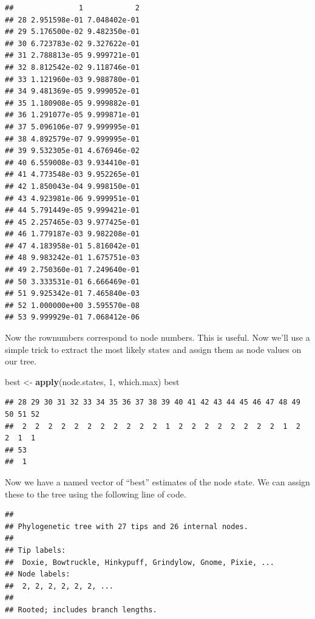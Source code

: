 \documentclass[]{book}
\newenvironment{Shaded}{\begin{snugshade}}{\end{snugshade}}
\newcommand{\KeywordTok}[1]{\textcolor[rgb]{0.13,0.29,0.53}{\textbf{{#1}}}}
\newcommand{\DecValTok}[1]{\textcolor[rgb]{0.00,0.00,0.81}{{#1}}}
\newcommand{\StringTok}[1]{\textcolor[rgb]{0.31,0.60,0.02}{{#1}}}
\newcommand{\NormalTok}[1]{{#1}}
\theoremstyle{definition}
\theoremstyle{definition}
\theoremstyle{definition}
\theoremstyle{remark}
\begin{document}
\begin{verbatim}
##               1            2
## 28 2.951598e-01 7.048402e-01
## 29 5.176500e-02 9.482350e-01
## 30 6.723783e-02 9.327622e-01
## 31 2.788813e-05 9.999721e-01
## 32 8.812542e-02 9.118746e-01
## 33 1.121960e-03 9.988780e-01
## 34 9.481369e-05 9.999052e-01
## 35 1.180908e-05 9.999882e-01
## 36 1.291077e-05 9.999871e-01
## 37 5.096106e-07 9.999995e-01
## 38 4.892579e-07 9.999995e-01
## 39 9.532305e-01 4.676946e-02
## 40 6.559008e-03 9.934410e-01
## 41 4.773548e-03 9.952265e-01
## 42 1.850043e-04 9.998150e-01
## 43 4.923981e-06 9.999951e-01
## 44 5.791449e-05 9.999421e-01
## 45 2.257465e-03 9.977425e-01
## 46 1.779187e-03 9.982208e-01
## 47 4.183958e-01 5.816042e-01
## 48 9.983242e-01 1.675751e-03
## 49 2.750360e-01 7.249640e-01
## 50 3.333531e-01 6.666469e-01
## 51 9.925342e-01 7.465840e-03
## 52 1.000000e+00 3.595570e-08
## 53 9.999929e-01 7.068412e-06
\end{verbatim}

Now the rownumbers correspond to node numbers. This is useful. Now we'll
use a simple trick to extract the most likely states and assign them as
node values on our tree.

\begin{Shaded}
\begin{Highlighting}[]
\NormalTok{best <-}\StringTok{ }\KeywordTok{apply}\NormalTok{(node.states, }\DecValTok{1}\NormalTok{, which.max)}
\NormalTok{best}
\end{Highlighting}
\end{Shaded}

\begin{verbatim}
## 28 29 30 31 32 33 34 35 36 37 38 39 40 41 42 43 44 45 46 47 48 49 50 51 52 
##  2  2  2  2  2  2  2  2  2  2  2  1  2  2  2  2  2  2  2  2  1  2  2  1  1 
## 53 
##  1
\end{verbatim}

Now we have a named vector of ``best'' estimates of the node state. We
can assign these to the tree using the following line of code.

\begin{Shaded}
\end{Shaded}

\begin{verbatim}
## 
## Phylogenetic tree with 27 tips and 26 internal nodes.
## 
## Tip labels:
##  Doxie, Bowtruckle, Hinkypuff, Grindylow, Gnome, Pixie, ...
## Node labels:
##  2, 2, 2, 2, 2, 2, ...
## 
## Rooted; includes branch lengths.
\end{verbatim}
\end{document}
